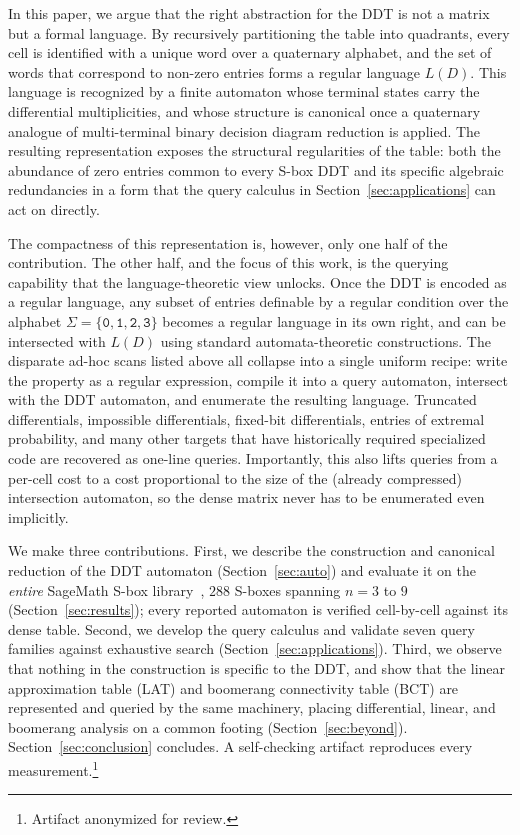 \documentclass[runningheads]{llncs}
\begin{document}
In this paper, we argue that the right abstraction for the DDT is not a matrix but
a formal language. By recursively partitioning the table into quadrants, every
cell is identified with a unique word over a quaternary alphabet, and the set of
words that correspond to non-zero entries forms a regular language $L(D)$. This
language is recognized by a finite automaton whose terminal states carry the
differential multiplicities, and whose structure is canonical once a quaternary
analogue of multi-terminal binary decision diagram reduction is applied. The
resulting representation exposes the structural regularities of the table:
both the abundance of zero entries common to every S-box DDT and its
specific algebraic redundancies in a form that the query calculus in
Section~\ref{sec:applications} can act on directly.

The compactness of this representation is, however, only one half of the
contribution. The other half, and the focus of this work, is the querying
capability that the language-theoretic view unlocks. Once the DDT is encoded as a
regular language, any subset of entries definable by a regular condition over the
alphabet $\Sigma = \{\texttt{0},\texttt{1},\texttt{2},\texttt{3}\}$ becomes a regular language in its own right, and can
be intersected with $L(D)$ using standard automata-theoretic constructions. The
disparate ad-hoc scans listed above all collapse into a single uniform recipe:
write the property as a regular expression, compile it into a query automaton,
intersect with the DDT automaton, and enumerate the resulting language. Truncated
differentials, impossible differentials, fixed-bit differentials, entries of
extremal probability, and many other targets that have historically required
specialized code are recovered as one-line queries. Importantly, this also lifts
queries from a per-cell cost to a cost proportional to the size of the (already
compressed) intersection automaton, so the dense matrix never has to be
enumerated even implicitly.

We make three contributions. First, we describe the construction and canonical
reduction of the DDT automaton (Section~\ref{sec:auto}) and evaluate it on the
\emph{entire} SageMath S-box library~\cite{sage}, $288$ S-boxes spanning $n=3$ to
$9$ (Section~\ref{sec:results}); every reported automaton is verified
cell-by-cell against its dense table. Second, we develop the query calculus and
validate seven query families against exhaustive search
(Section~\ref{sec:applications}). Third, we observe that nothing in the
construction is specific to the DDT, and show that the linear approximation table
(LAT) and boomerang connectivity table (BCT) are represented and queried by the
same machinery, placing differential, linear, and boomerang analysis on a common
footing (Section~\ref{sec:beyond}). Section~\ref{sec:conclusion} concludes. A
self-checking artifact reproduces every measurement.\footnote{Artifact anonymized
for review.}
\end{document}
